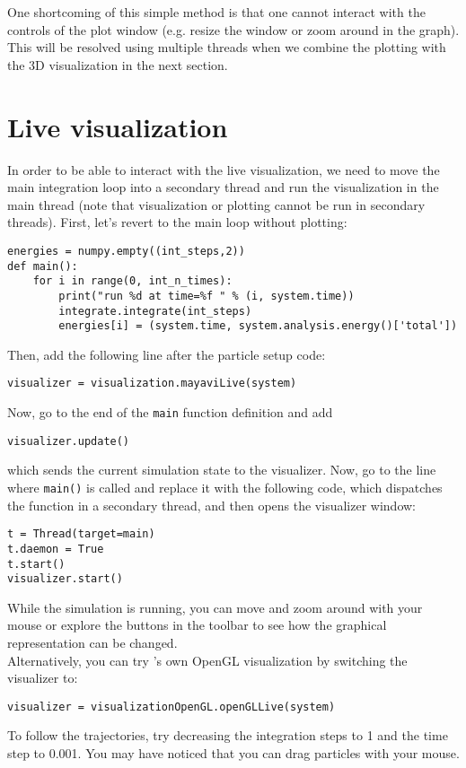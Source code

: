 \documentclass[
paper=a4,                       %
fontsize=11pt,                  %
twoside,                        %
footsepline,                    %
headsepline,                    %
headinclude=false,              %
footinclude=false,              %
pagesize,                       %
]{scrartcl}
\begin{document}
\noindent One shortcoming of this simple method is that one cannot interact with the controls of the plot window (e.g. resize the window or zoom around in the graph).
This will be resolved using multiple threads when we combine the plotting with the 3D visualization in the next section.

\section{Live visualization}
\label{vis}

In order to be able to interact with the live visualization, we need to move the main integration loop into a secondary thread and run the visualization in the main thread (note that visualization or plotting cannot be run in secondary threads). First, let's revert to the main loop without plotting:
\begin{lstlisting}
energies = numpy.empty((int_steps,2))
def main():
    for i in range(0, int_n_times):
        print("run %d at time=%f " % (i, system.time))
        integrate.integrate(int_steps)
        energies[i] = (system.time, system.analysis.energy()['total'])
\end{lstlisting}

Then, add the following line after the particle setup code:
\begin{lstlisting}
visualizer = visualization.mayaviLive(system)
\end{lstlisting}
Now, go to the end of the \lstinline{main} function definition and add
\begin{lstlisting}
visualizer.update()
\end{lstlisting}
which sends the current simulation state to the visualizer.
Now, go to the line where \lstinline{main()} is called and replace it with the following code, which dispatches the function in a secondary thread, and then opens the visualizer window:
\begin{lstlisting}
t = Thread(target=main)
t.daemon = True
t.start()
visualizer.start()
\end{lstlisting}
While the simulation is running, you can move and zoom around with your mouse or explore the buttons in the toolbar to see how the graphical representation can be changed.\\

\noindent Alternatively, you can try \es's own OpenGL visualization by switching the visualizer to:
\begin{lstlisting}
visualizer = visualizationOpenGL.openGLLive(system)
\end{lstlisting}
To follow the trajectories, try decreasing the integration steps to 1 and the time step to 0.001. 
You may have noticed that you can drag particles with your mouse. 
\end{document}
